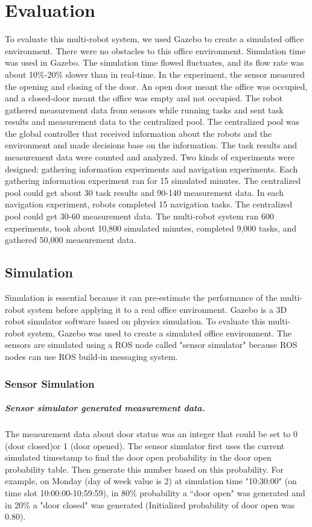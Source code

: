 \chapter{Evaluation}
\label{ch:evaluation}
To evaluate this multi-robot system, we used Gazebo to create a simulated office environment. There were no obstacles to this office environment. Simulation time was used in Gazebo. The simulation time flowed fluctuates, and its flow rate was about 10\%-20\% slower than in real-time. In the experiment, the sensor measured the opening and closing of the door. An open door meant the office was occupied, and a closed-door meant the office was empty and not occupied. The robot gathered measurement data from sensors while running tasks and sent task results and measurement data to the centralized pool. The centralized pool was the global controller that received information about the robots and the environment and made decisions base on the information. The task results and measurement data were counted and analyzed. Two kinds of experiments were designed: gathering information experiments and navigation experiments. Each gathering information experiment ran for 15 simulated minutes. The centralized pool could get about 30 task results and 90-140 measurement data. In each navigation experiment, robots completed 15 navigation tasks. The centralized pool could get 30-60 measurement data. The multi-robot system ran 600 experiments, took about 10,800 simulated minutes, completed 9,000 tasks, and gathered 50,000 measurement data. 

\section{Simulation}

Simulation is essential because it can pre-estimate the performance of the multi-robot system before applying it to a real office environment.
Gazebo is a 3D robot simulator software based on physics simulation. 
To evaluate this multi-robot system, Gazebo was used to create a simulated office environment. The sensors are simulated using a ROS node called "sensor simulator" because ROS nodes can use ROS build-in messaging system.

\subsection{Sensor Simulation}
\label{sec:sensor_simulation}

\paragraph{Sensor simulator generated measurement data.}
The measurement data about door status was an integer that could be set to 0 (door closed)or 1 (door opened). The sensor simulator first uses the current simulated timestamp to find the door open probability in the door open probability table. Then generate this number based on this probability. For example, on Monday (day of week value is 2) at simulation time "10:30:00" (on time slot 10:00:00-10:59:59), in 80\% probability a ``door open" was generated and in 20\% a "door closed" was generated (Initialized probability of door open was 0.80).

